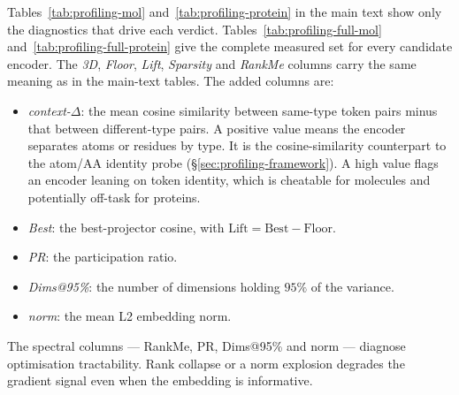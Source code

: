 \documentclass[12pt,a4paper,twoside]{report}
\begin{document}
Tables~\ref{tab:profiling-mol} and~\ref{tab:profiling-protein} in the main text show only the diagnostics that drive each verdict. Tables~\ref{tab:profiling-full-mol} and~\ref{tab:profiling-full-protein} give the complete measured set for every candidate encoder. The \emph{3D}, \emph{Floor}, \emph{Lift}, \emph{Sparsity} and \emph{RankMe} columns carry the same meaning as in the main-text tables. The added columns are:
\begin{itemize}[topsep=2pt,itemsep=1pt]
  \item \emph{context-$\Delta$}: the mean cosine similarity between same-type token pairs minus that between different-type pairs. A positive value means the encoder separates atoms or residues by type. It is the cosine-similarity counterpart to the atom/AA identity probe (\S\ref{sec:profiling-framework}). A high value flags an encoder leaning on token identity, which is cheatable for molecules and potentially off-task for proteins.
  \item \emph{Best}: the best-projector cosine, with $\text{Lift}=\text{Best}-\text{Floor}$.
  \item \emph{PR}: the participation ratio.
  \item \emph{Dims@95\%}: the number of dimensions holding $95\%$ of the variance.
  \item \emph{norm}: the mean L2 embedding norm.
\end{itemize}
The spectral columns --- RankMe, PR, Dims@95\% and norm --- diagnose optimisation tractability. Rank collapse or a norm explosion degrades the gradient signal even when the embedding is informative.



\label{lastpage}
\end{document}
